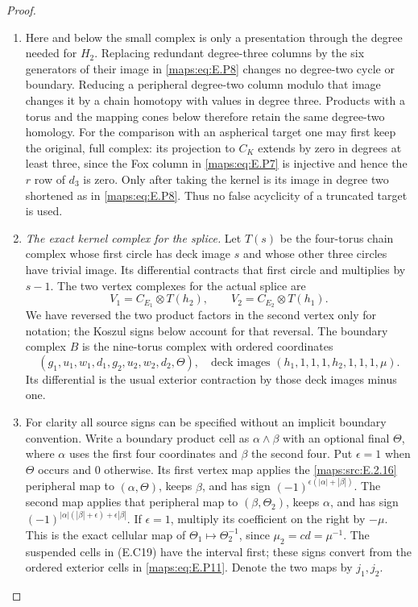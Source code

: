 \begin{proof}
\begin{enumerate}[label=\arabic*.,leftmargin=*]
\item Here and below the small complex is only a
presentation through the degree needed for $H_2$.
Replacing redundant degree-three columns by the six
generators of their image in \eqref{maps:eq:E.P8} changes no
degree-two cycle or boundary. Reducing a peripheral
degree-two column modulo that image changes it by
a chain homotopy with values in degree three.
Products with a torus and the mapping cones below
therefore retain the same degree-two homology.
For the comparison with an aspherical target one
may first keep the original, full complex: its
projection to $C_K$ extends by zero in degrees at
least three, since the Fox column in \eqref{maps:eq:E.P7} is
injective and hence the $r$ row of $d_3$ is zero.
Only after taking the kernel is its image in degree
two shortened as in \eqref{maps:eq:E.P8}. Thus no false
acyclicity of a truncated target is used.

\item \emph{The exact kernel complex for the splice.}
Let $T(s)$ be the four-torus chain complex whose
first circle has deck image $s$ and whose other
three circles have trivial image. Its differential
contracts that first circle and multiplies by $s-1$.
The two vertex complexes for the actual splice are
\[
 V_1=C_{E_1}\otimes T(h_2),\qquad
 V_2=C_{E_2}\otimes T(h_1).
 \tag{E.P10}\label{maps:eq:E.P10}
\]
We have reversed the two product factors in the
second vertex only for notation; the Koszul signs
below account for that reversal. The boundary
complex $B$ is the nine-torus complex with ordered
coordinates
\[
 (g_1,u_1,w_1,d_1,g_2,u_2,w_2,d_2,\Theta),
 \quad\text{deck images }(h_1,1,1,1,h_2,1,1,1,\mu).
 \tag{E.P11}\label{maps:eq:E.P11}
\]
Its differential is the usual exterior contraction
by those deck images minus one.

\item For clarity all source signs can be specified
without an implicit boundary convention. Write
a boundary product cell as $\alpha\wedge\beta$
with an optional final $\Theta$, where $\alpha$
uses the first four coordinates and $\beta$ the
second four. Put $\epsilon=1$ when $\Theta$ occurs
and $0$ otherwise. Its first vertex map applies
the \ref{maps:src:E.2.16} peripheral map to $(\alpha,\Theta)$,
keeps $\beta$, and has sign
$(-1)^{\epsilon(|\alpha|+|\beta|)}$.
The second map applies that peripheral map to
$(\beta,\Theta_2)$, keeps $\alpha$, and has sign
$(-1)^{|\alpha|(|\beta|+\epsilon)+\epsilon|\beta|}$.
If $\epsilon=1$, multiply its coefficient on the
right by $-\mu$. This is the exact cellular map
of $\Theta_1\mapsto\Theta_2^{-1}$, since
$\mu_2=cd=\mu^{-1}$. The suspended cells in (E.C19)
have the interval first; these signs convert from
the ordered exterior cells in \eqref{maps:eq:E.P11}.
Denote the two maps by $j_1,j_2$.


\end{enumerate}
\end{proof}
